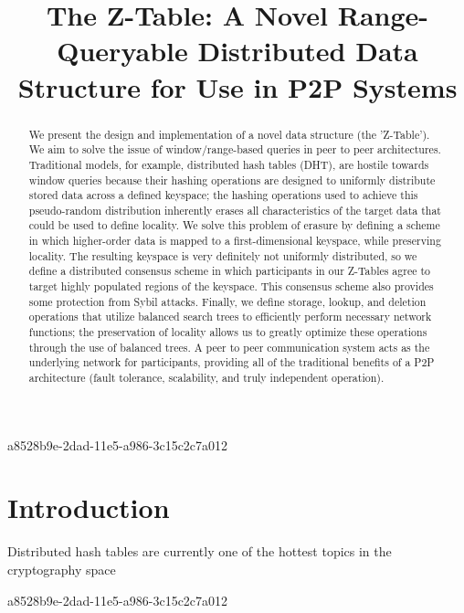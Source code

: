 \documentclass[12pt]{article}
\title{The Z-Table: A Novel Range-Queryable Distributed Data Structure for Use in P2P Systems}
\begin{document}
a8528b9e-2dad-11e5-a986-3c15c2c7a012\maketitle

\begin{abstract}
We present the design and implementation of a novel data structure (the 'Z-Table'). We aim to solve the issue of window/range-based queries in peer to peer architectures. Traditional models, for example,  distributed hash tables (DHT), are hostile towards window queries because their hashing operations are designed to uniformly distribute stored data across a defined keyspace; the hashing operations used to achieve this pseudo-random distribution inherently erases all characteristics of the target data that could be used to define locality. We solve this problem of erasure by defining a scheme in which higher-order data is mapped to a first-dimensional keyspace, while preserving locality. The resulting keyspace is very definitely not uniformly distributed, so we define a distributed consensus scheme in which participants in our Z-Tables agree to target highly populated regions of the keyspace. This consensus scheme also provides some protection from Sybil attacks. Finally, we define storage, lookup, and deletion operations that utilize balanced search trees to efficiently perform necessary network functions; the preservation of locality allows us to greatly optimize these operations through the use of balanced trees. A peer to peer communication system acts as the underlying network for participants, providing all of the traditional benefits of a P2P architecture (fault tolerance, scalability, and truly independent operation).
\end{abstract}


\newpage
\section{Introduction}
Distributed hash tables are currently one of the hottest topics in the cryptography space~\cite{Stoica:2001dj,Rowstron:2001ea,Ratnasamy:2001wn}

\printbibliography
a8528b9e-2dad-11e5-a986-3c15c2c7a012
\end{document}
